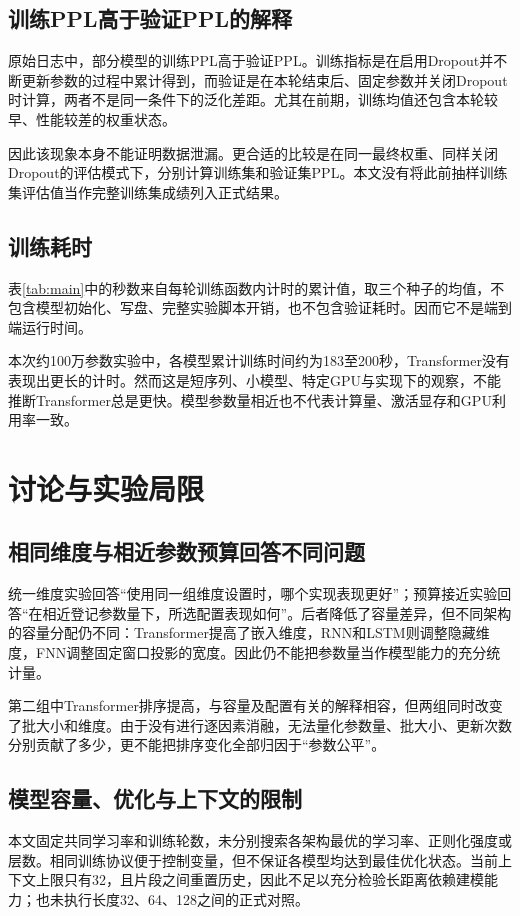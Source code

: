﻿\documentclass[UTF8,a4paper,12pt]{ctexart}
\begin{document}
\subsection{训练PPL高于验证PPL的解释}
原始日志中，部分模型的训练PPL高于验证PPL。训练指标是在启用Dropout并不断更新参数的过程中累计得到，而验证是在本轮结束后、固定参数并关闭Dropout时计算，两者不是同一条件下的泛化差距。尤其在前期，训练均值还包含本轮较早、性能较差的权重状态。

因此该现象本身不能证明数据泄漏。更合适的比较是在同一最终权重、同样关闭Dropout的评估模式下，分别计算训练集和验证集PPL。本文没有将此前抽样训练集评估值当作完整训练集成绩列入正式结果。

\subsection{训练耗时}
表\ref{tab:main}中的秒数来自每轮训练函数内计时的累计值，取三个种子的均值，不包含模型初始化、写盘、完整实验脚本开销，也不包含验证耗时。因而它不是端到端运行时间。

本次约100万参数实验中，各模型累计训练时间约为183至200秒，Transformer没有表现出更长的计时。然而这是短序列、小模型、特定GPU与实现下的观察，不能推断Transformer总是更快。模型参数量相近也不代表计算量、激活显存和GPU利用率一致。

\section{讨论与实验局限}
\subsection{相同维度与相近参数预算回答不同问题}
统一维度实验回答“使用同一组维度设置时，哪个实现表现更好”；预算接近实验回答“在相近登记参数量下，所选配置表现如何”。后者降低了容量差异，但不同架构的容量分配仍不同：Transformer提高了嵌入维度，RNN和LSTM则调整隐藏维度，FNN调整固定窗口投影的宽度。因此仍不能把参数量当作模型能力的充分统计量。

第二组中Transformer排序提高，与容量及配置有关的解释相容，但两组同时改变了批大小和维度。由于没有进行逐因素消融，无法量化参数量、批大小、更新次数分别贡献了多少，更不能把排序变化全部归因于“参数公平”。

\subsection{模型容量、优化与上下文的限制}
本文固定共同学习率和训练轮数，未分别搜索各架构最优的学习率、正则化强度或层数。相同训练协议便于控制变量，但不保证各模型均达到最佳优化状态。当前上下文上限只有32，且片段之间重置历史，因此不足以充分检验长距离依赖建模能力；也未执行长度32、64、128之间的正式对照。
\end{document}
